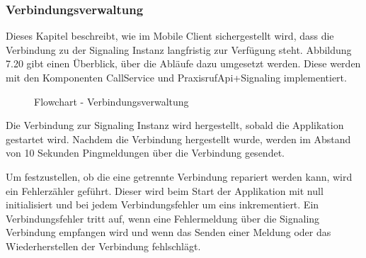 \subsubsection{Verbindungsverwaltung}

Dieses Kapitel beschreibt, wie im Mobile Client sichergestellt wird, dass die Verbindung zu der Signaling Instanz langfristig zur Verfügung steht.
Abbildung 7.20 gibt einen Überblick, über die Abläufe dazu umgesetzt werden.
Diese werden mit den Komponenten CallService und PraxisrufApi+Signaling implementiert.

\begin{figure}[h]
    \centering
    \begin{minipage}[b]{1\textwidth}
        \caption{Flowchart - Verbindungsverwaltung}
    \end{minipage}
\end{figure}

Die Verbindung zur Signaling Instanz wird hergestellt, sobald die Applikation gestartet wird.
Nachdem die Verbindung hergestellt wurde, werden im Abstand von 10 Sekunden Pingmeldungen über die Verbindung gesendet.

Um festzustellen, ob die eine getrennte Verbindung repariert werden kann, wird ein Fehlerzähler geführt.
Dieser wird beim Start der Applikation mit null initialisiert und bei jedem Verbindungsfehler um eins inkrementiert.
Ein Verbindungsfehler tritt auf, wenn eine Fehlermeldung über die Signaling Verbindung empfangen wird und wenn das Senden einer Meldung oder das Wiederherstellen der Verbindung fehlschlägt.

